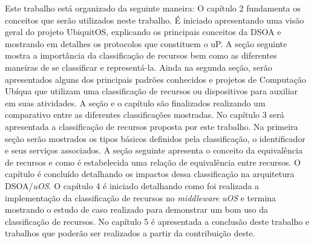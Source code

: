 Este trabalho está organizado da seguinte maneira: O capítulo 2 fundamenta os conceitos que serão utilizados neste trabalho. É iniciado apresentando uma visão geral do projeto UbiquitOS, explicando os principais conceitos da DSOA e mostrando em detalhes os protocolos que constituem o uP. A seção seguinte mostra a importância da classificação de recursos bem como as diferentes maneiras de se classificar e representá-la. Ainda na segunda seção, serão apresentados alguns dos principais padrões conhecidos e projetos de Computação Ubíqua que utilizam uma classificação de recursos ou dispositivos para auxiliar em suas atividades. A seção e o capítulo são finalizados realizando um comparativo entre as diferentes classificações mostradas. No capítulo 3 será apresentada a classificação de recursos proposta por este trabalho. Na primeira seção serão mostrados os tipos básicos definidos pela classificação, o identificador e seus serviços associados. A seção seguinte apresenta o conceito da equivalência de recursos e como é estabelecida uma relação de equivalência entre recursos. O capítulo é concluído detalhando os impactos dessa classificação na arquitetura DSOA/\emph{uOS}. O capítulo 4 é iniciado detalhando como foi realizada a implementação da classificação de recursos no \emph{middleware} \emph{uOS} e termina mostrando o estudo de caso realizado para demonstrar um bom uso da classificação de recursos. No capítulo 5 é apresentada a conclusão deste trabalho e trabalhos que poderão ser realizados a partir da contribuição deste.